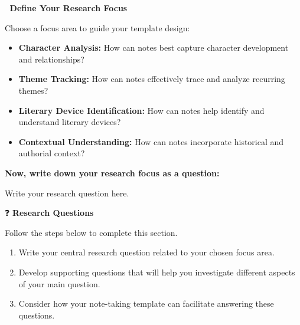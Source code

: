 \documentclass[a4paper,12pt]{article}
\newcommand{\sectionfont}[1]{{\headerfont\fontsize{20pt}{24pt}\selectfont\bfseries #1}}
\newcommand{\emoji}[1]{{\emojifont #1}}
\begin{document}
\vspace{4pt}

\begin{sectionheader}
\emoji{🎯} \sectionfont{Define Your Research Focus}
\end{sectionheader}

\vspace{4pt}

Choose a focus area to guide your template design:

\begin{itemize}[leftmargin=1.5em, itemsep=2pt, topsep=4pt]
  \item \textbf{Character Analysis:} How can notes best capture character development and relationships?
  \item \textbf{Theme Tracking:} How can notes effectively trace and analyze recurring themes?
  \item \textbf{Literary Device Identification:} How can notes help identify and understand literary devices?
  \item \textbf{Contextual Understanding:} How can notes incorporate historical and authorial context?
\end{itemize}

\textbf{Now, write down your research focus as a question:}

\vspace{4pt}

\begin{inputbox}
Write your research question here.\par
\vspace{1.5cm}
\end{inputbox}

\vspace{4pt}

\begin{sectionheader}
\emoji{❓} \sectionfont{Research Questions}
\end{sectionheader}

\vspace{4pt}

Follow the steps below to complete this section.

\begin{enumerate}[leftmargin=1.5em, itemsep=2pt, topsep=4pt]
  \item Write your central research question related to your chosen focus area.
  \item Develop supporting questions that will help you investigate different aspects of your main question.
  \item Consider how your note-taking template can facilitate answering these questions.
\end{enumerate}
\end{document}
